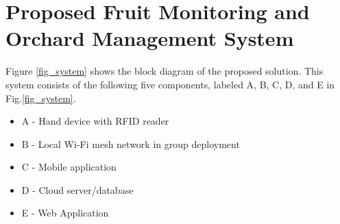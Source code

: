 \documentclass[journal]{IEEEtran}
\begin{document}
\section{Proposed Fruit Monitoring and Orchard Management System}
Figure \ref{fig_system} shows the block diagram of the proposed solution. This system consists of the following five components, labeled A, B, C, D, and E in Fig.\ref{fig_system}.
\begin{itemize}
	\item[] A - Hand device with RFID reader
	\item[] B - Local Wi-Fi mesh network in group deployment
	\item[] C - Mobile application
	\item[] D - Cloud server/database
	\item[] E - Web Application
\end{itemize}
\end{document}
